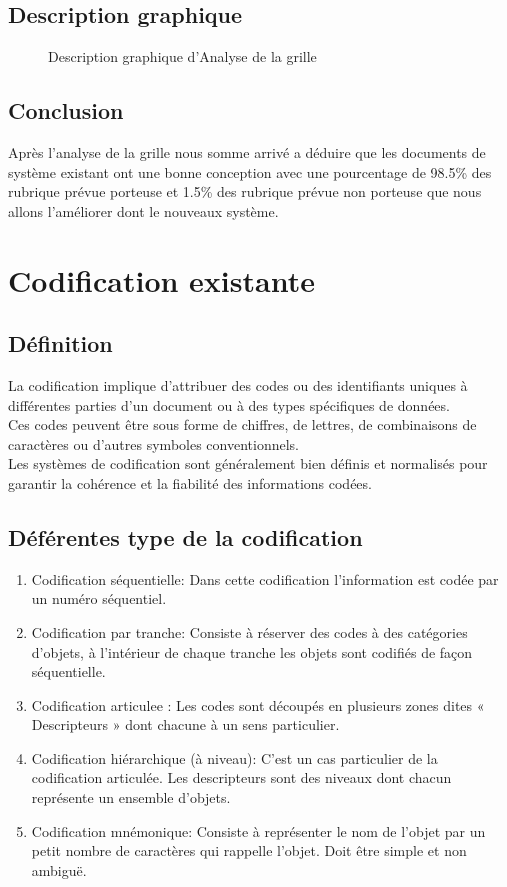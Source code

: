 \subsection{Description graphique}
    \begin{figure}[H]
        \centering
        \caption{Description graphique d'Analyse de la grille }
    \label{fig:piechart}
    \end{figure}
\subsection{Conclusion}
Après l’analyse de la grille nous somme arrivé a déduire que les documents de système existant ont une bonne conception avec une pourcentage de 98.5\% 
des rubrique prévue porteuse et 1.5\% des rubrique prévue non porteuse que nous allons l’améliorer dont le nouveaux système.
\section{Codification existante}
\subsection{Définition}
La codification implique d'attribuer des codes ou des identifiants uniques à différentes parties d'un document ou à des types spécifiques de données.\\
 Ces codes peuvent être sous forme de chiffres, de lettres, de combinaisons de caractères ou d'autres symboles conventionnels.\\
 Les systèmes de codification sont généralement bien définis et normalisés pour garantir la cohérence et la fiabilité des informations codées.
 \subsection{Déférentes type de la codification }
 \begin{enumerate}
    \item Codification séquentielle: Dans cette codification l'information est codée
par un numéro séquentiel.
    \item Codification par tranche: Consiste à réserver des codes à des catégories
d'objets, à l'intérieur de chaque tranche les objets sont codifiés de façon
séquentielle.
    \item Codification articulee : Les codes sont découpés en plusieurs zones dites
    « Descripteurs » dont chacune à un sens particulier.
    \item Codification hiérarchique (à niveau): C'est un cas particulier de la
    codification articulée. Les descripteurs sont des niveaux dont chacun
    représente un ensemble d'objets.
    \item Codification mnémonique: Consiste à représenter le nom de l'objet par un
    petit nombre de caractères qui rappelle l'objet. Doit être simple et non
    ambiguë.
 \end{enumerate}
